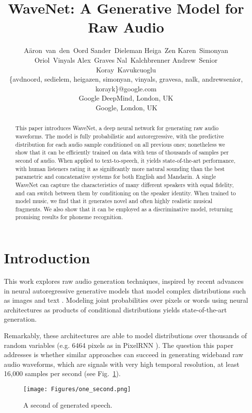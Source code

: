 \documentclass{article}
\title{
WaveNet: A Generative Model for Raw Audio
}
\author{A\"{a}ron~van~den~Oord \And
\hspace{-0.5cm}Sander~Dieleman \And
Heiga~Zen \AND
Karen~Simonyan \And
Oriol~Vinyals \And
Alex~Graves \AND
Nal~Kalchbrenner \And
\hspace{1cm}Andrew~Senior \And
Koray~Kavukcuoglu \AND \\
\{avdnoord, sedielem, heigazen, simonyan, vinyals, gravesa, nalk, andrewsenior, korayk\}@google.com\\
Google DeepMind, London, UK \\ 
\,Google, London, UK
}
\makeatletter
\newcommand{\figref}[1]{Fig.~\ref{#1}}
\newcommand*{\eg}{e.g.\@\xspace}
\makeatother
\begin{document}
 


\maketitle


\vskip 0.3in


\begin{abstract}
This paper introduces WaveNet, a deep neural network for generating raw audio waveforms. The model is fully probabilistic and autoregressive, with the predictive distribution for each audio sample conditioned on all previous ones; nonetheless we show that it can be efficiently trained on data with tens of thousands of samples per second of audio. 
When applied to text-to-speech, it yields state-of-the-art performance, with human listeners rating it as significantly more natural sounding than the best parametric and concatenative systems for both English and Mandarin. A single WaveNet can capture the characteristics of many different speakers with equal fidelity, and can switch between them by conditioning on the speaker identity. When trained to model music, we find that it generates novel and often highly realistic musical fragments. We also show that it can be employed as a discriminative model, returning promising results for phoneme recognition.
\end{abstract} 


\section{Introduction}

This work explores raw audio generation techniques, inspired by recent advances in neural autoregressive generative models that model complex distributions such as images \citep{van2016pixel, ConditionalPixelCNN} and text \citep{RafalLanguage}. Modeling joint probabilities over pixels or words using neural architectures as products of conditional distributions yields state-of-the-art generation.

Remarkably, these architectures are able to model distributions over thousands of random variables (\eg 6464 pixels as in PixelRNN \citep{van2016pixel}). The question this paper addresses is whether similar approaches can succeed in generating wideband raw audio waveforms, which are signals with very high temporal resolution, at least 16,000 samples per second (see \figref{fig:audio}).

\begin{figure}[htb]
\texttt{[image: Figures/one\_second.png]}
\caption{A second of generated speech.}
\label{fig:audio}
\end{figure}
\end{document}
